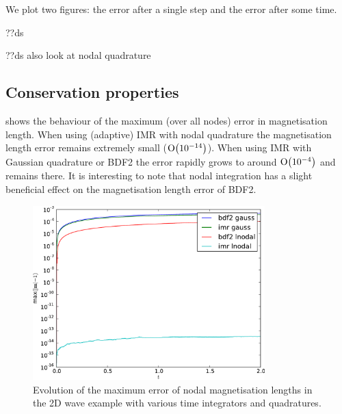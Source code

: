 We plot two figures: the error after a single step and the error after some time.

??ds

??ds also look at nodal quadrature




\subsection{Conservation properties}
\label{sec:2d-wave-results-cons-prop}

 shows the behaviour of the maximum (over all nodes) error in magnetisation length.
When using (adaptive) IMR with nodal quadrature the magnetisation length error remains extremely small ($\mathrm{O}{\left( 10^{-14} \right)}$).
When using IMR with Gaussian quadrature or BDF2 the error rapidly grows to around $\mathrm{O}{\left( 10^{-4} \right)}$ and remains there.
It is interesting to note that nodal integration has a slight beneficial effect on the magnetisation length error of BDF2.

\begin{figure}
  \centering
  \includegraphics[width=0.8\textwidth]{plots/2d_wave_solution_m_length/mlengtherrormaxesvstimes}
  \caption{Evolution of the maximum error of nodal magnetisation lengths in the 2D wave example with various time integrators and quadratures.}
  \label{fig:mean-ml-error-2d}
\end{figure}

